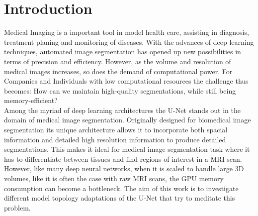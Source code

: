 \chapter{Introduction}
\noindent Medical Imaging is a important tool in model health care, assisting in diagnosis, treatment planing and monitoring of diseases.
With the advances of deep learning techniques, automated image segmentation has opened up new possibilities in terms of precision and efficiency.\cite[1-2]{zhou_review_2021}
However, as the volume and resolution of medical images increases, so does the demand of computational power.\cite[1]{wang_super-resolution_2023}
For Companies and Individuals with low computational resources the challenge thus becomes: How can we maintain high-quality segmentations, while still being memory-efficient?\\[1ex]
Among the myriad of deep learning architectures the U-Net stands out in the domain of medical image segmentation.
Originally designed for biomedical image segmentation its unique architecture allows it to incorporate both spacial information and detailed high resolution information to produce detailed segmentations.\cite{ronneberger_u-net_2015}
This makes it ideal for medical image segmentation task where it has to differentiate between tissues and find regions of interest in a MRI scan.
However, like many deep neural networks, when it is scaled to handle large 3D volumes, like it is often the case with raw MRI scans, the GPU memory consumption can become a bottleneck.
The aim of this work is to investigate different model topology adaptations of the U-Net that try to meditate this problem.

